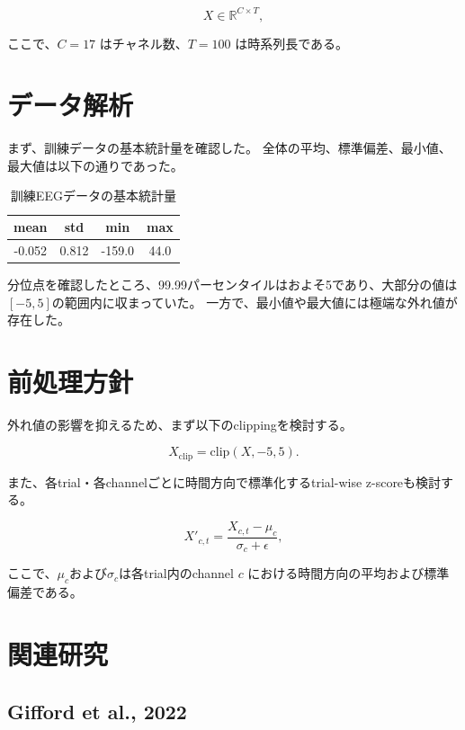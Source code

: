 \documentclass[a4paper,11pt]{jsarticle}
\begin{document}
\begin{equation}
    X \in \mathbb{R}^{C \times T},
\end{equation}

ここで、$C=17$ はチャネル数、$T=100$ は時系列長である。

\section{データ解析}

まず、訓練データの基本統計量を確認した。
全体の平均、標準偏差、最小値、最大値は以下の通りであった。

\begin{table}[h]
\centering
\caption{訓練EEGデータの基本統計量}
\begin{tabular}{cccc}
\toprule
mean & std & min & max \\
\midrule
-0.052 & 0.812 & -159.0 & 44.0 \\
\bottomrule
\end{tabular}
\end{table}

分位点を確認したところ、99.99パーセンタイルはおよそ5であり、大部分の値は$[-5,5]$の範囲内に収まっていた。
一方で、最小値や最大値には極端な外れ値が存在した。

\section{前処理方針}

外れ値の影響を抑えるため、まず以下のclippingを検討する。

\begin{equation}
    X_{\mathrm{clip}} = \mathrm{clip}(X, -5, 5).
\end{equation}

また、各trial・各channelごとに時間方向で標準化するtrial-wise z-scoreも検討する。

\begin{equation}
    X'_{c,t} = \frac{X_{c,t} - \mu_c}{\sigma_c + \epsilon},
\end{equation}

ここで、$\mu_c$および$\sigma_c$は各trial内のchannel $c$ における時間方向の平均および標準偏差である。

\section{関連研究}

\subsection{Gifford et al., 2022}
\end{document}
